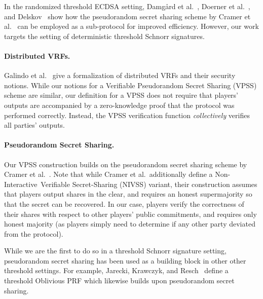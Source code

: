In the randomized threshold ECDSA setting,
Damg{\aa}rd et al.~\cite{DamgardJNPO22},
Doerner et al.~\cite{DoernerKLS23},
and Delskov~\cite{DalskovOKSS20}
show how  the pseudorandom secret sharing scheme by Cramer et al.~\cite{CramerDI05} can be employed as a sub-protocol for improved efficiency.
However, our work targets the setting of deterministic threshold Schnorr signatures.

\paragraph{Distributed VRFs.}
Galindo et al.~\cite{GalindoLOW21} give a formalization of distributed VRFs and their security notions.
While our notions for a Verifiable Pseudorandom Secret Sharing (VPSS) scheme are similar,
our definition for a VPSS does not require that players' outputs are accompanied by a zero-knowledge proof that the protocol was performed correctly.
Instead,
the VPSS verification function \emph{collectively} verifies all parties' outputs.


\paragraph{Pseudorandom Secret Sharing.}
Our VPSS construction \DVRFOne builds on the pseudorandom secret sharing scheme by Cramer et al.~\cite{CramerDI05}.
Note that while Cramer et al.\ additionally define a Non-Interactive\ Verifiable Secret-Sharing (NIVSS)  variant,
their construction assumes that players output shares in the clear,
and requires an honest supermajority so that the secret can be recovered.
In our case, players verify the correctness of their shares with respect to other players' public commitments,
and requires only honest majority (as players simply need to determine if any other party deviated from the protocol).

While we are the first to do so in a threshold Schnorr signature setting,
pseudorandom secret sharing has been used as a building block in other other threshold settings.
For example,
Jarecki, Krawczyk, and Resch~\cite{JareckiKR18} define a threshold Oblivious PRF which likewise builds upon pseudorandom secret sharing.

